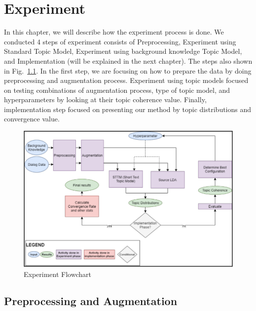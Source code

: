 \documentclass[senior]{IPSstyle}
\begin{document}
\chapter{Experiment} 

In this chapter, we will describe how the experiment process is done. We conducted 4 steps of experiment consists of Preprocessing, Experiment using Standard Topic Model, Experiment using background knowledge Topic Model, and Implementation (will be explained in the next chapter). The steps also shown in Fig.~\ref{fig_flow}. In the first step, we are focusing on how to prepare the data by doing preprocessing and augmentation process. Experiment using topic models focused on testing combinations of augmentation process, type of topic model, and hyperparameters by looking at their topic coherence value. Finally, implementation step focused on presenting our method by topic distributions and convergence value.

\begin{figure}[h]
	\centering
	\includegraphics[scale=0.5]{images/flowchart.png}
	\caption{Experiment Flowchart}
\label{fig_flow}
\end{figure}

\section{Preprocessing and Augmentation}
\end{document}
